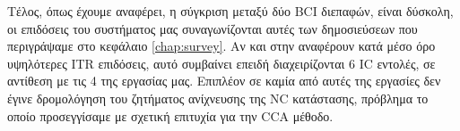 \documentclass[11pt,a4paper,english,greek,twoside]{../Thesis}
\begin{document}
\par Τέλος, όπως έχουμε αναφέρει, η σύγκριση μεταξύ δύο BCI διεπαφών, είναι δύσκολη,  οι επιδόσεις του συστήματος μας συναγωνίζονται αυτές των δημοσιεύσεων \cite{Lin2014-cp}\cite{Liu2012-qj} που περιγράψαμε στο κεφάλαιο \ref{chap:survey}. Αν και στην  \cite{Liu2012-qj} αναφέρουν κατά μέσο όρο υψηλότερες ITR επιδόσεις, αυτό συμβαίνει επειδή διαχειρίζονται 6 IC εντολές, σε αντίθεση με τις 4 της εργασίας μας. Επιπλέον σε καμία από αυτές της εργασίες δεν έγινε δρομολόγηση του ζητήματος ανίχνευσης της NC κατάστασης, πρόβλημα το οποίο προσεγγίσαμε με σχετική επιτυχία για την CCA μέθοδο.

\end{document}
